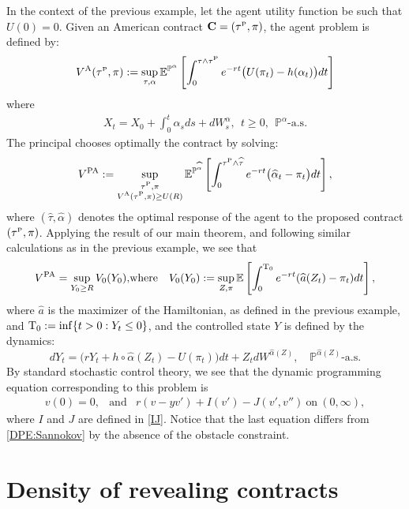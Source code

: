 \documentclass[11pt,a4paper]{article}
\numberwithin{equation}{section}
\def\dbE{\mathbb{E}}
\def\dbP{\mathbb{P}}
\newcommand{\Cbf}{\mathbf{C}}
\newcommand{\beaa}{\begin{eqnarray*}}
\newcommand{\eeaa}{\end{eqnarray*}}
\theoremstyle{definition}
\begin{document}
In the context of the previous example, let the agent utility function be such that $U(0)=0$. Given an American contract $\Cbf=(\tau^{\scriptscriptstyle\rm P},\pi)$, the agent problem is defined by:
 \beaa
 V^{\rm A}(\tau^{\scriptscriptstyle\rm P},\pi)
 :=
 \sup_{\tau,\alpha} \dbE^{\dbP^{\alpha}}\left[\int_0^{\tau\wedge\tau^{\scriptscriptstyle\rm P}} e^{-rt}\big(U(\pi_t)-h(\alpha_t)\big) dt\right]
 \eeaa
where
 \beaa
 X_t=X_0+\int_0^t \alpha_sds+dW^\alpha_s, 
   ~~t\geq 0,~~\dbP^\alpha\mbox{-a.s}.
 \eeaa
The principal chooses optimally the contract by solving:
 \beaa
  V^{\rm PA} :=
  \sup_{\substack{\tau^{\scriptscriptstyle\rm P}, \pi \\ V^{\rm A}(\tau^{\scriptscriptstyle\rm P},\pi) \geq U(R)}} 
   \dbE^{\dbP^{\widehat\alpha}}
  \left[\int_0^{\tau^{\rm P}\wedge\widehat\tau} e^{-rt}\big(\widehat\alpha_t-\pi_t\big)dt\right],
 \eeaa
where $(\widehat\tau,\widehat\alpha)$ denotes the optimal response of the agent to the proposed contract $(\tau^{\scriptscriptstyle\rm P},\pi)$. Applying the result of our main theorem, and following similar calculations as in the previous example, we see that 
 \beaa
  V^{\rm PA} = \sup_{Y_0\ge R}V_0(Y_0),
   &\mbox{where}&
  V_0(Y_0) := \sup_{Z,\pi} \dbE \left[\int_0^{{\rm T}_0} e^{-rt}(\widehat a(Z_t)-\pi_t)dt\right],
 \eeaa
where $\widehat a$ is the maximizer of the Hamiltonian, as defined in the previous example, and ${\rm T}_0:=\inf\{t>0: Y_t\le 0\}$, and the controlled state $Y$ is defined by the dynamics:
 $$ dY_t = \big(rY_t + h\circ\widehat\alpha(Z_t) - U(\pi_t)\big)dt + Z_t dW^{\widehat\alpha(Z)}, \quad \dbP^{\widehat\alpha(Z)}\mbox{-a.s.} $$
By standard stochastic control theory, we see that the dynamic programming equation corresponding to this problem is
 \beaa
 v(0)=0,
 &\mbox{and}&
 r (v-yv')+I(v')-J(v',v'')~\mbox{on}~(0,\infty),
 \eeaa
where $I$ and $J$ are defined in \eqref{IJ}. Notice that the last equation differs from \eqref{DPE:Sannokov}  by the absence of the obstacle constraint. 

\section{Density of revealing contracts} 
\label{sec:proof}
\end{document}

